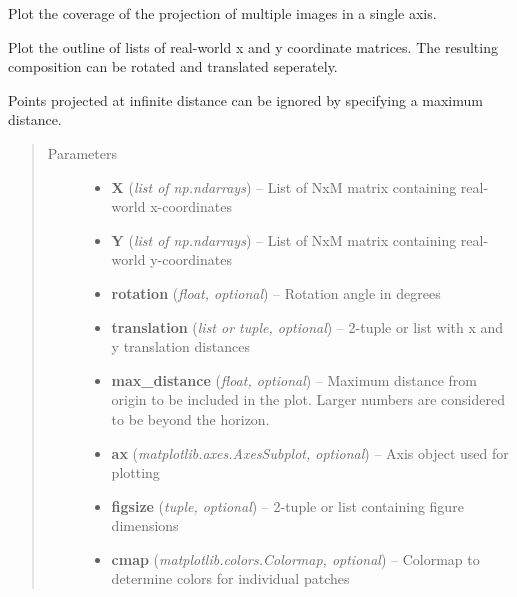 \documentclass[letterpaper,10pt,english]{sphinxmanual}
\begin{document}
\begin{fulllineitems}
\label{flamingo/rectification/index:flamingo.rectification.plot.plot_coverage}
Plot the coverage of the projection of multiple images in a single axis.

Plot the outline of lists of real-world x and y coordinate
matrices. The resulting composition can be rotated and
translated seperately.

Points projected at infinite distance can be ignored by
specifying a maximum distance.
\begin{quote}\begin{description}
\item[{Parameters}] \leavevmode\begin{itemize}
\item {} 
\textbf{X} (\emph{list of np.ndarrays}) -- List of NxM matrix containing real-world x-coordinates

\item {} 
\textbf{Y} (\emph{list of np.ndarrays}) -- List of NxM matrix containing real-world y-coordinates

\item {} 
\textbf{rotation} (\emph{float, optional}) -- Rotation angle in degrees

\item {} 
\textbf{translation} (\emph{list or tuple, optional}) -- 2-tuple or list with x and y translation distances

\item {} 
\textbf{max\_distance} (\emph{float, optional}) -- Maximum distance from origin to be included in the plot.
Larger numbers are considered to be beyond the horizon.

\item {} 
\textbf{ax} (\emph{matplotlib.axes.AxesSubplot, optional}) -- Axis object used for plotting

\item {} 
\textbf{figsize} (\emph{tuple, optional}) -- 2-tuple or list containing figure dimensions

\item {} 
\textbf{cmap} (\emph{matplotlib.colors.Colormap, optional}) -- Colormap to determine colors for individual patches


\end{itemize}
\end{description}
\end{quote}
\end{fulllineitems}
\end{document}
